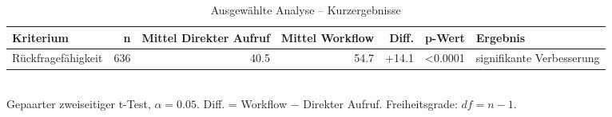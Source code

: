 \begin{table}[htbp]
\centering
\caption{Ausgewählte Analyse -- Kurzergebnisse}
\begin{tabular}{lrrrrrl}
\toprule
Kriterium & n & Mittel Direkter Aufruf & Mittel Workflow & Diff. & p-Wert & Ergebnis \\
\midrule
Rückfragefähigkeit & 636 & 40.5 & 54.7 & +14.1 & <0.0001 & signifikante Verbesserung \\
\bottomrule
\end{tabular}
\\[2mm]
\footnotesize Gepaarter zweiseitiger t-Test, $\alpha=0.05$. Diff. = Workflow $-$ Direkter Aufruf. Freiheitsgrade: $df=n-1$.
\end{table}

